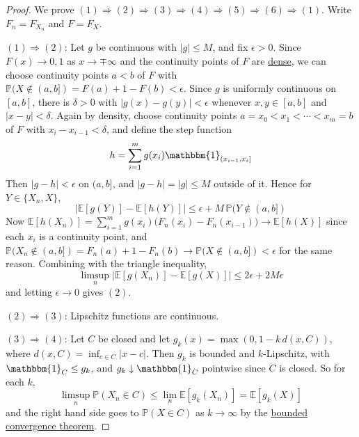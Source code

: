   \begin{proof}
    We prove $(1) \Rightarrow (2) \Rightarrow (3) \Rightarrow (4) \Rightarrow (5) \Rightarrow (6) \Rightarrow (1)$. Write $F_n = F_{X_n}$ and $F = F_X$.

    $(1) \Rightarrow (2)$: Let $g$ be continuous with $|g| \leq M$, and fix $\epsilon > 0$. Since $F(x) \to 0, 1$ as $x \to \mp\infty$ and the continuity points of $F$ are \hyperref[thm:continuity-points-of-a-cdf-are-dense]{dense}, we can choose continuity points $a < b$ of $F$ with $\mathbb{P}(X \notin (a, b]) = F(a) + 1 - F(b) < \epsilon$. Since $g$ is uniformly continuous on $[a, b]$, there is $\delta > 0$ with $|g(x) - g(y)| < \epsilon$ whenever $x, y \in [a, b]$ and $|x - y| < \delta$. Again by density, choose continuity points $a = x_0 < x_1 < \cdots < x_m = b$ of $F$ with $x_i - x_{i-1} < \delta$, and define the step function
    \begin{equation}
      h = \sum_{i=1}^m g(x_i) \mathbbm{1}_{(x_{i-1}, x_i]}
    \end{equation}
    Then $|g - h| < \epsilon$ on $(a, b]$, and $|g - h| = |g| \leq M$ outside of it. Hence for $Y \in \{X_n, X\}$,
    \begin{equation}
      |\mathbb{E}[g(Y)] - \mathbb{E}[h(Y)]| \leq \epsilon + M \, \mathbb{P}(Y \notin (a, b])
    \end{equation}
    Now $\mathbb{E}[h(X_n)] = \sum_{i=1}^m g(x_i) \big( F_n (x_i) - F_n (x_{i-1}) \big) \to \mathbb{E}[h(X)]$ since each $x_i$ is a continuity point, and $\mathbb{P}(X_n \notin (a, b]) = F_n (a) + 1 - F_n (b) \to \mathbb{P}(X \notin (a, b]) < \epsilon$ for the same reason. Combining with the triangle inequality,
    \begin{equation}
      \limsup_{n} |\mathbb{E}[g(X_n)] - \mathbb{E}[g(X)]| \leq 2 \epsilon + 2 M \epsilon
    \end{equation}
    and letting $\epsilon \to 0$ gives $(2)$.

    $(2) \Rightarrow (3)$: Lipschitz functions are continuous.

    $(3) \Rightarrow (4)$: Let $C$ be closed and let $g_k (x) = \max(0, 1 - k \, d(x, C))$, where $d(x, C) = \inf_{c \in C} |x - c|$. Then $g_k$ is bounded and $k$-Lipschitz, with $\mathbbm{1}_C \leq g_k$, and $g_k \downarrow \mathbbm{1}_C$ pointwise since $C$ is closed. So for each $k$,
    \begin{equation}
      \limsup_{n} \mathbb{P}(X_n \in C) \leq \lim_{n} \mathbb{E}[g_k (X_n)] = \mathbb{E}[g_k (X)]
    \end{equation}
    and the right hand side goes to $\mathbb{P}(X \in C)$ as $k \to \infty$ by the \hyperref[mt-thm:bounded-convergence-theorem]{bounded convergence theorem}.


\end{proof}
